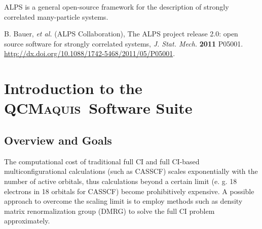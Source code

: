 \documentclass[bibliography=totoc,12pt,a4paper]{scrartcl}
\newcommand{\mol}{\textsc{OpenMolcas}}
\newcommand{\qcm}{\textsc{QCMaquis}}
\newcommand{\hostp}{\mol}
\begin{document}
ALPS is a general open-source framework for the description of strongly correlated many-particle systems.
\begin{framed}
B. Bauer, \textit{et al.} (ALPS Collaboration), The ALPS project release 2.0: open source software for strongly correlated systems, \textit{J. Stat. Mech.} \textbf{2011} P05001. \href{http://dx.doi.org/10.1088/1742-5468/2011/05/P05001}{http://dx.doi.org/10.1088/1742-5468/2011/05/P05001}.
\end{framed}

%
%
%
%
%



\clearpage


\tableofcontents
\clearpage


\section{Introduction to the \qcm\ Software Suite}

\subsection{Overview and Goals}
The computational cost of traditional full CI and full CI-based multiconfigurational calculations (such as CASSCF) scales exponentially with the number of active orbitals, thus calculations beyond a certain limit (e. g. 18 electrons in 18 orbitals for CASSCF) become prohibitively expensive. A possible approach to overcome the scaling limit is to employ methods such as density matrix renormalization group (DMRG) \cite{Schollwock_AnnPhys_densitymatrix_2011,Marti_ZPhysChem_Density_2010,Chan2011,Chan_JChemPhys_Matrix_2016} to solve the full CI problem approximately.
\end{document}
